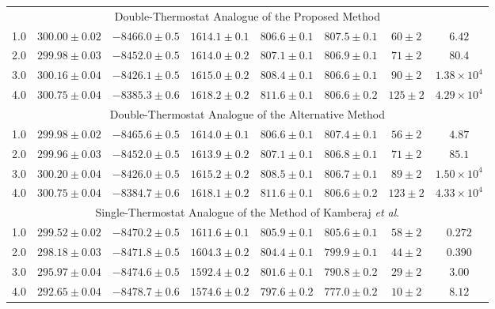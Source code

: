 \documentclass[aip,jcp,reprint,amsmath,amssymb]{revtex4-1}
\begin{document}
\begin{table}
\begin{ruledtabular}
\begin{tabular}{cccccccc}
\hline
\multicolumn{8}{c}{Double-Thermostat Analogue of the Proposed Method} \\
1.0 & $300.00\pm0.02$ & $-8466.0\pm0.5$ & $1614.1\pm0.1$ & $806.6\pm0.1$ & $807.5\pm0.1$ & $60\pm2$ & $6.42$\\
2.0 & $299.98\pm0.03$ & $-8452.0\pm0.5$ & $1614.0\pm0.2$ & $807.1\pm0.1$ & $806.9\pm0.1$ & $71\pm2$ & $80.4$ \\
3.0 & $300.16\pm0.04$ & $-8426.1\pm0.5$ & $1615.0\pm0.2$ & $808.4\pm0.1$ & $806.6\pm0.1$ & $90\pm2$ & $1.38\times10^4$ \\
4.0 & $300.75\pm0.04$ & $-8385.3\pm0.6$ & $1618.2\pm0.2$ & $811.6\pm0.1$ & $806.6\pm0.2$ & $125\pm2$ & $4.29\times10^4$ \\

\hline
\multicolumn{8}{c}{Double-Thermostat Analogue of the Alternative Method} \\
1.0 & $299.98\pm0.02$ & $-8465.6\pm0.5$ & $1614.0\pm0.1$ & $806.6\pm0.1$ & $807.4\pm0.1$ & $56\pm2$ & $4.87$ \\
2.0 & $299.96\pm0.03$ & $-8452.0\pm0.5$ & $1613.9\pm0.2$ & $807.1\pm0.1$ & $806.8\pm0.1$ & $71\pm2$ & $85.1$ \\
3.0 & $300.20\pm0.04$ & $-8426.0\pm0.5$ & $1615.2\pm0.2$ & $808.5\pm0.1$ & $806.7\pm0.1$ & $89\pm2$ & $1.50\times10^4$ \\
4.0 & $300.75\pm0.04$ & $-8384.7\pm0.6$ & $1618.1\pm0.2$ & $811.6\pm0.1$ & $806.6\pm0.2$ & $123\pm2$ & $4.33\times10^4$ \\

\hline
\multicolumn{8}{c}{Single-Thermostat Analogue of the Method of Kamberaj \textit{et al}.\cite{Kamberaj2005}} \\
1.0 & $299.52\pm0.02$ & $-8470.2\pm0.5$ & $1611.6\pm0.1$ & $805.9\pm0.1$ & $805.6\pm0.1$ & $58\pm2$ & $0.272$ \\
2.0 & $298.18\pm0.03$ & $-8471.8\pm0.5$ & $1604.3\pm0.2$ & $804.4\pm0.1$ & $799.9\pm0.1$ & $44\pm2$ & $0.390$ \\
3.0 & $295.97\pm0.04$ & $-8474.6\pm0.5$ & $1592.4\pm0.2$ & $801.6\pm0.1$ & $790.8\pm0.2$ & $29\pm2$ & $3.00$ \\
4.0 & $292.65\pm0.04$ & $-8478.7\pm0.6$ & $1574.6\pm0.2$ & $797.6\pm0.2$ & $777.0\pm0.2$ & $10\pm2$ & $8.12$ \\

\end{tabular}
\end{ruledtabular}
\end{table}
\end{document}
